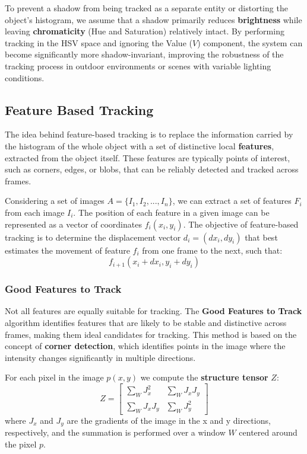 To prevent a shadow from being tracked as a separate entity or distorting the object's histogram, 
we assume that a shadow primarily reduces \textbf{brightness} while leaving \textbf{chromaticity} (Hue and Saturation) relatively intact. 
By performing tracking in the HSV space and ignoring the Value ($V$) component, 
the system can become significantly more shadow-invariant, improving the robustness of the tracking process in outdoor 
environments or scenes with variable lighting conditions.

\subsection{Feature Based Tracking}
The idea behind feature-based tracking is to replace the information carried by the histogram of the whole object 
with a set of distinctive local \textbf{features}, extracted from the object itself.
These features are typically points of interest, such as corners, edges, or blobs, that can be reliably detected and tracked across frames.

Considering a set of images $A = \{I_1, I_2, ..., I_n\}$, we can extract a set of features $F_i$ from each image $I_i$.
The position of each feature in a given image can be represented as a vector of coordinates $f_i(x_i, y_i)$.
The objective of feature-based tracking is to determine the displacement vector $d_i = (dx_i, dy_i)$ that best estimates the movement of
feature $f_i$ from one frame to the next, such that:
$$f_{i+1}(x_i + dx_i, y_i + dy_i)$$

\subsubsection{Good Features to Track}
Not all features are equally suitable for tracking. 
The \textbf{Good Features to Track} algorithm identifies features that are likely to be stable and distinctive across frames, making them ideal candidates for tracking.
This method is based on the concept of \textbf{corner detection}, which identifies points in the image where the intensity changes significantly in multiple directions.

For each pixel in the image $p(x, y)$ we compute the \textbf{structure tensor} $Z$:
$$Z = \begin{bmatrix}
    \sum_{W} J_x^2 & \sum_{W} J_x J_y \\
    \sum_{W} J_x J_y & \sum_{W} J_y^2
\end{bmatrix}$$
where $J_x$ and $J_y$ are the gradients of the image in the x and y directions, respectively, 
and the summation is performed over a window $W$ centered around the pixel $p$.

